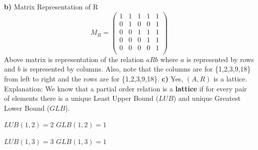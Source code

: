\documentclass[11pt]{article}
\begin{document}
\begin{center}
\end{center}
\newline  \newline
\noindent \textbf{b)} Matrix Representation of R \newline \newline
\[
    M_R = 
    \begin{pmatrix}
        1 & 1 & 1 & 1 & 1 \\
        0 & 1 & 0 & 0 & 1 \\
        0 & 0 & 1 & 1 & 1 \\
        0 & 0 & 0 & 1 & 1 \\
        0 & 0 & 0 & 0 & 1 \\ 
    \end{pmatrix}
    
\]
Above matrix is representation of the relation $aRb$ where $a$ is represented by rows and $b$ is represented by columns. Also, note that the columns are for \{1,2,3,9,18\} from left to right and the rows are for \{1,2,3,9,18\}.
\newline \newline
\newpage
\noindent \textbf{c)} \newline \newline
Yes, $(A,R)$ is a lattice. \newline \newline
Explanation: \newline \newline
We know that a partial order relation is a \textbf{lattice} if for every pair of elements there is a unique Least Upper Bound ($LUB$) and unique Greatest Lower Bound ($GLB$). \newline \newline 

 \noindent$LUB(1,2) = 2$ \space \space  \space   \space \space  \space   \space \space  \space  \space \space  \space$GLB(1,2) = 1$ \newline

\noindent$LUB(1,3) = 3 $ \space \space  \space   \space \space  \space   \space \space  \space  \space \space  \space$GLB(1,3) = 1$ \newline
\end{document}
